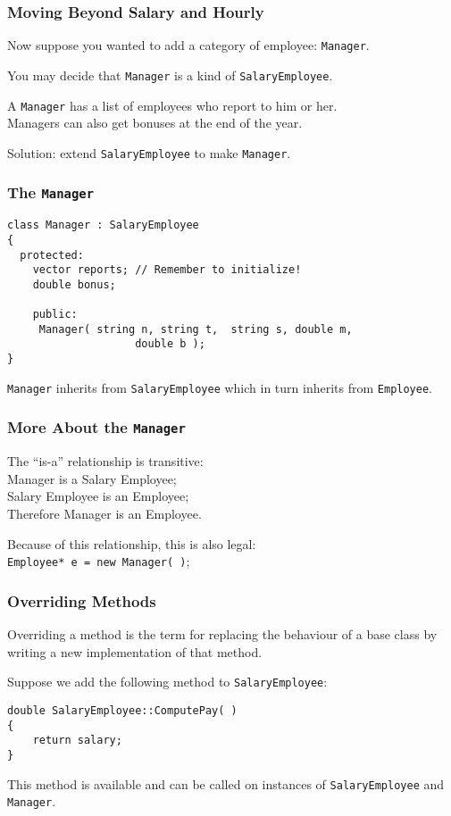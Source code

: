\begin{frame}
\frametitle{Moving Beyond Salary and Hourly}
Now suppose you wanted to add a category of employee: \texttt{Manager}.

You may decide that \texttt{Manager} is a kind of \texttt{SalaryEmployee}.

A \texttt{Manager} has a list of employees who report to him or her.\\
Managers can also get bonuses at the end of the year.

Solution: extend \texttt{SalaryEmployee} to make \texttt{Manager}.

\end{frame}

\begin{frame}[fragile]
\frametitle{The \texttt{Manager}}

{\small
\begin{verbatim}
class Manager : SalaryEmployee
{
  protected:
    vector reports; // Remember to initialize!
    double bonus;

    public:
     Manager( string n, string t,  string s, double m,
                    double b );
}
\end{verbatim}
}
\end{frame}

\begin{frame}

\texttt{Manager} inherits from \texttt{SalaryEmployee} which in turn inherits from \texttt{Employee}.

\frametitle{More About the \texttt{Manager}}
The ``is-a'' relationship is transitive:\\
\quad Manager is a Salary Employee;\\
\quad Salary Employee is an Employee;\\
\quad Therefore Manager is an Employee.

Because of this relationship, this is also legal:\\
\quad \texttt{Employee* e = new Manager( )};

\end{frame}


\begin{frame}[fragile]
\frametitle{Overriding Methods}

Overriding a method is the term for replacing the behaviour of a base class by writing a new implementation of that method.

Suppose we add the following method to \texttt{SalaryEmployee}:
\begin{verbatim}
double SalaryEmployee::ComputePay( )
{
    return salary;
}
\end{verbatim}

This method is available and can be called on instances of \texttt{SalaryEmployee} and \texttt{Manager}.

\end{frame}


